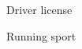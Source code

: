 

\begin{cventries}

  \cventry
    {} %
    {} %
    {} %
    {} %
    {
      \begin{cvitems} %
        \item {Driver license}
        \item {Running sport}
      \end{cvitems}
    }

\end{cventries}
